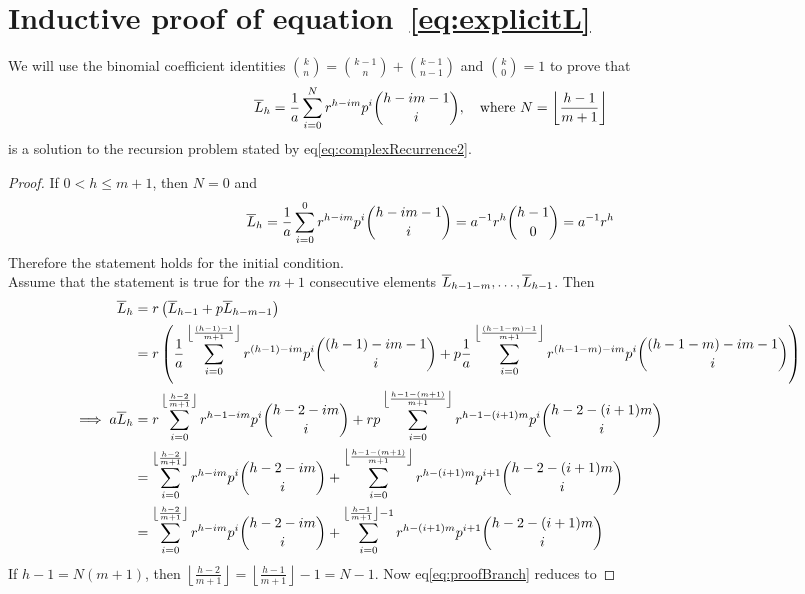 \appendix
\section{Inductive proof of equation~\ref{eq:explicitL}}\label{sect:genLProof}
We will use the binomial coefficient identities ${k \choose n} = {k-1 \choose n} + {k-1 \choose n-1}$ and ${k \choose 0} = 1$ to prove that
\begin{align}
    \overline{L}_h &= \frac{1}{a}\sum_{i=0}^{N} r^{h-im}p^{i}{h-im-1 \choose i}, \quad \mbox{where } N = \left\lfloor{\frac{h-1}{m+1}}\right\rfloor\nonumber
\end{align}
is a solution to the recursion problem stated by eq\ref{eq:complexRecurrence2}.
\begin{proof}
If $0 < h \leq m+1$, then $N = 0$ and
\begin{align}
	\overline{L}_h &= \frac{1}{a}\sum_{i=0}^{0} r^{h-im}p^{i}{h-im-1 \choose i}\nonumber
    = a^{-1}r^{h}{h-1 \choose 0}\nonumber
         = a^{-1}r^{h}\nonumber
\end{align}
Therefore the statement holds for the initial condition.\\
Assume that the statement is true for the $m+1$ consecutive elements $\overline{L}_{h-1-m},\ldots,\overline{L}_{h-1}$. Then
\begin{align}
	\overline{L}_h &= r\left(\overline{L}_{h-1} + p\overline{L}_{h-m-1}\right)\nonumber\\
         &= r\left(\frac{1}{a}\sum_{i=0}^{\left\lfloor{\frac{(h-1)-1}{m+1}}\right\rfloor} r^{(h-1)-im}p^{i}{(h-1)-im-1 \choose i} +
         p\frac{1}{a}\sum_{i=0}^{\left\lfloor{\frac{(h-1-m)-1}{m+1}}\right\rfloor} r^{(h-1-m)-im}p^{i}{(h-1-m)-im-1 \choose i}\right)\nonumber\\
   \implies a\overline{L}_h &= r\sum_{i=0}^{\left\lfloor{\frac{h-2}{m+1}}\right\rfloor} r^{h-1-im}p^{i}{h-2-im \choose i} +
         rp\sum_{i=0}^{\left\lfloor{\frac{h-1-(m+1)}{m+1}}\right\rfloor} r^{h-1-(i+1)m}p^{i}{h-2-(i+1)m \choose i}\nonumber\\
         &= \sum_{i=0}^{\left\lfloor{\frac{h-2}{m+1}}\right\rfloor} r^{h-im}p^{i}{h-2-im \choose i} +
         \sum_{i=0}^{\left\lfloor{\frac{h-1-(m+1)}{m+1}}\right\rfloor} r^{h-(i+1)m}p^{i+1}{h-2-(i+1)m \choose i}\nonumber\\
         &= \sum_{i=0}^{\left\lfloor{\frac{h-2}{m+1}}\right\rfloor} r^{h-im}p^{i}{h-2-im \choose i} +
         \sum_{i=0}^{\left\lfloor{\frac{h-1}{m+1}}\right\rfloor-1} r^{h-(i+1)m}p^{i+1}{h-2-(i+1)m \choose i}\label{eq:proofBranch}
\end{align}
If $h-1 = N(m+1)$, then $\left\lfloor{\frac{h-2}{m+1}}\right\rfloor = \left\lfloor{\frac{h-1}{m+1}}\right\rfloor-1 = N-1$. Now eq\ref{eq:proofBranch} reduces to

\end{proof}
